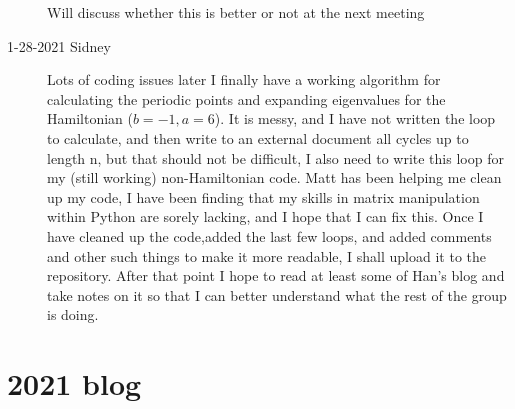 \begin{description}
Will discuss whether this is better or not at the next meeting

\item[1-28-2021 Sidney]
Lots of coding issues later I finally have a working algorithm for
calculating the periodic points and expanding eigenvalues for the
Hamiltonian {\HenonMap} ($b=-1,a=6$). It is messy, and I have not written
the loop to calculate, and then write to an external document all cycles
up to length n, but that should not be difficult, I also need to write
this loop for my (still working) non-Hamiltonian code. Matt has been
helping me clean up my code, I have been finding that my skills in matrix
manipulation within Python are sorely lacking, and I hope that I can fix
this. Once I have cleaned up the code,added the last few loops, and added
comments and other such things to make it more readable, I shall upload
it to the repository. After that point I hope to read at least some of
Han's blog and take notes on it so that I can better understand what the
rest of the group is doing.
\end{description}


\section{2021 blog}
\label{sect:sidney2021}

